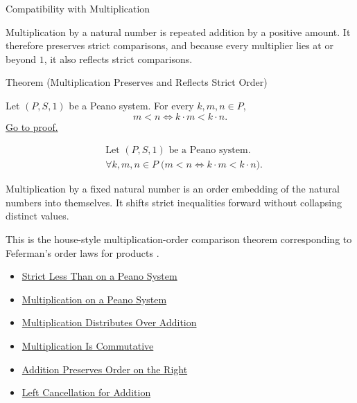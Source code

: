\begin{topicbox}{Compatibility with Multiplication}
\begin{exposition}
Multiplication by a natural number is repeated addition by a positive amount.
It therefore preserves strict comparisons, and because every multiplier lies
at or beyond $1$, it also reflects strict comparisons.
\end{exposition}

\begin{theorembox}{Theorem (Multiplication Preserves and Reflects Strict Order)}
\begin{theorem}
\label{thm:multiplication-preserves-and-reflects-strict-order}
Let $(P,S,1)$ be a Peano system. For every $k,m,n \in P$,
\[
m<n
\Longleftrightarrow
k\cdot m<k\cdot n.
\]
\hyperref[prf:multiplication-preserves-and-reflects-strict-order]{Go to proof.}
\end{theorem}
\end{theorembox}

\begin{remark*}
\[
\begin{aligned}
&\text{Let } (P,S,1) \text{ be a Peano system.}\\
&\forall k,m,n \in P\;\bigl(m<n \Longleftrightarrow k\cdot m<k\cdot n\bigr).
\end{aligned}
\]
\end{remark*}

\begin{remark*}[Interpretation]
Multiplication by a fixed natural number is an order embedding of the natural
numbers into themselves. It shifts strict inequalities forward without
collapsing distinct values.
\end{remark*}

\begin{remark*}
This is the house-style multiplication-order comparison theorem corresponding
to Feferman's order laws for products \citep{FefermanNumberSystems1964}.
\end{remark*}

\begin{dependencies}
\begin{itemize}
  \item \hyperref[def:strict-less-than-on-peano-system]{Strict Less Than on a Peano System}
  \item \hyperref[def:multiplication-on-peano-system]{Multiplication on a Peano System}
  \item \hyperref[thm:multiplication-distributes-over-addition]{Multiplication Distributes Over Addition}
  \item \hyperref[thm:multiplication-commutative]{Multiplication Is Commutative}
  \item \hyperref[thm:addition-preserves-order-on-right]{Addition Preserves Order on the Right}
  \item \hyperref[thm:addition-left-cancellation]{Left Cancellation for Addition}
\end{itemize}
\end{dependencies}
\end{topicbox}

